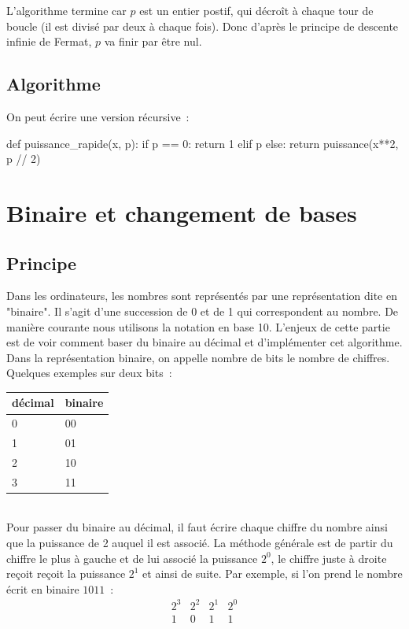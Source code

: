 		L'algorithme termine car $p$ est un entier postif, qui décroît à chaque tour de boucle (il est divisé par deux à chaque fois). Donc d'après le principe de descente infinie de Fermat, $p$ va finir par être nul.
	
	\subsection{Algorithme}
		On peut écrire une version récursive~:
		\begin{pythoncode}
			def puissance_rapide(x, p):
				if p == 0: return 1
				elif p %
				else: return puissance(x**2, p // 2)
		\end{pythoncode}


\section{Binaire et changement de bases}

	\subsection{Principe}
		
		Dans les ordinateurs, les nombres sont représentés par une représentation dite en "binaire". Il s'agit d'une succession de 0 et de 1 qui correspondent au nombre. De manière courante nous utilisons la notation en base 10. L'enjeux de cette partie est de voir comment baser du binaire au décimal et d'implémenter cet algorithme. Dans la représentation binaire, on appelle nombre de bits le nombre de chiffres. Quelques exemples sur deux bits~: \\
		\begin{tabular}{|l|l|} \hline
			décimal & binaire \\ \hline
			0 & 00 \\ \hline
			1 & 01 \\ \hline
			2 & 10 \\ \hline
			3 & 11 \\ \hline
		\end{tabular} \\

		Pour passer du binaire au décimal, il faut écrire chaque chiffre du nombre ainsi que la puissance de 2 auquel il est associé. La méthode générale est de partir du chiffre le plus à gauche et de lui associé la puissance $2^0$, le chiffre juste à droite reçoit reçoit la puissance $2^1$ et ainsi de suite. Par exemple, si l'on prend le nombre écrit en binaire $1011$~:
		\[ \begin{array}{llll}
			2^3 & 2^2 & 2^1 & 2^0 \\
			1   & 0   & 1   & 1 \\
		\end{array} \]
		
